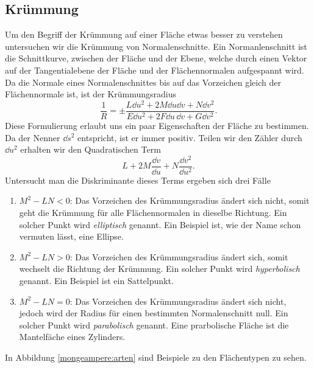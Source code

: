\subsection{Krümmung}
Um den Begriff der Krümmung auf einer Fläche etwas besser zu verstehen
untersuchen wir die Krümmung von Normalenschnitte.
Ein Normanlenschnitt ist die Schnittkurve, zwischen der Fläche und der Ebene, welche durch einen Vektor auf 
der Tangentialebene der Fläche und der Flächennormalen aufgespannt wird.
Da die Normale eines Normalenschnittes bis auf das Vorzeichen gleich der Flächennormale ist, ist der 
Krümmungsradius
\begin{equation}
  \frac{1}{R} = \pm \frac{L \dd u^2 + 2 M \dd u \dd v + N \dd v^2}
                  {E \dd u^2 + 2F \dd u \, \dd v + G\dd v^2}.
  \label{mongeampere:normkrum}
\end{equation}
Diese Formulierung erlaubt uns ein paar Eigenschaften der Fläche zu bestimmen.
Da der Nenner $\dd s^2$ entspricht, ist er immer positiv. 
Teilen wir den Zähler durch $\dd u^2$ erhalten wir den Quadratischen Term
\begin{equation}
   L + 2M \frac{\dd v}{\dd u} + N \frac{\dd v^2}{\dd u ^2}.
  \label{mongemapere:dsik}
\end{equation}
Untersucht man die Diskriminante dieses Terms ergeben sich drei Fälle
\begin{enumerate}
  \item $M^2 - LN < 0$: Das Vorzeichen des Krümmungsradius ändert sich nicht, somit geht die Krümmung für alle 
    Flächennormalen in dieselbe Richtung. 
    Ein solcher Punkt wird \emph{elliptisch} genannt. Ein Beispiel ist, wie der 
    Name schon vermuten lässt, eine Ellipse.
  \item $M^2 - LN > 0$: Das Vorzeichen des Krümmungsradius ändert sich, somit wechselt die Richtung der Krümmung.
    Ein solcher Punkt wird \emph{hyperbolisch} genannt. Ein Beispiel ist ein Sattelpunkt.
  \item $M^2 - LN = 0$: Das Vorzeichen des Krümmungsradius ändert sich nicht, jedoch wird der Radius für einen 
    bestimmten Normalenschnitt null. 
    Ein solcher Punkt wird \emph{parabolisch} genannt. Eine prarbolische Fläche ist die Mantelfäche eines Zylinders. 
\end{enumerate}
In Abbildung \ref{mongeampere:arten} sind Beispiele zu den Flächentypen zu sehen.
